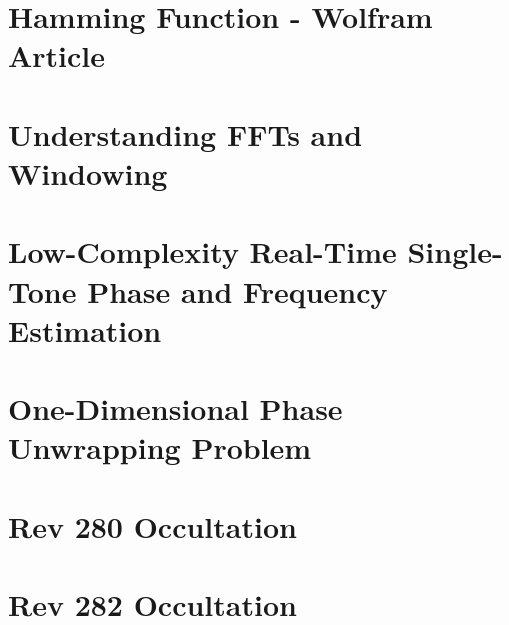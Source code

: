 \documentclass[crop=false,class=book,oneside]{standalone}
\begin{document}
    \section{Hamming Function - Wolfram Article}
    \section{Understanding FFTs and Windowing}
    \section{Low-Complexity Real-Time Single-Tone Phase
             and Frequency Estimation}
    \section{One-Dimensional Phase Unwrapping Problem}
    \section{Rev 280 Occultation}
    \section{Rev 282 Occultation}
\end{document}

